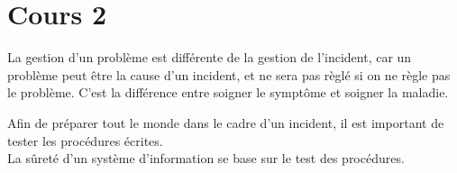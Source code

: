 \section{Cours 2}
La gestion d'un probl\`eme est diff\'erente de la gestion de l'incident, car un probl\`eme peut \^etre la cause d'un
incident, et ne sera pas r\`egl\'e si on ne r\`egle pas le probl\`eme. C'est la diff\'erence entre soigner le sympt\^ome
et soigner la maladie.

Afin de pr\'eparer tout le monde dans le cadre d'un incident, il est important de tester les proc\'edures \'ecrites.\\
La s\^uret\'e d'un syst\`eme d'information se base sur le test des proc\'edures.
